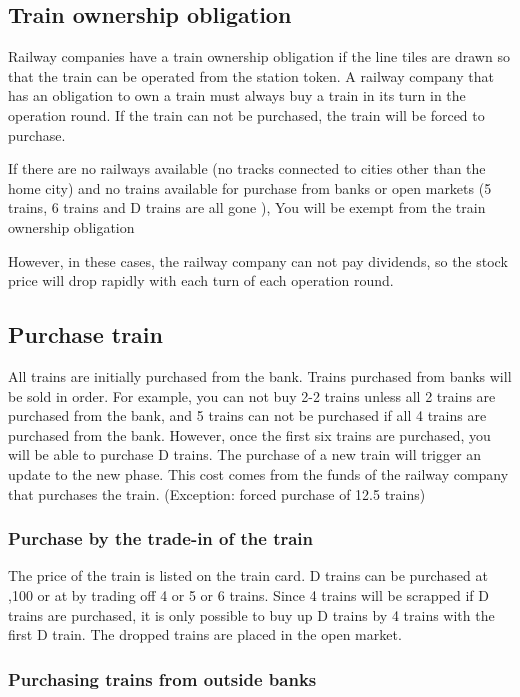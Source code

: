 \documentclass{article}
\begin{document}
\begin{CJK}{UTF8}{min}
\subsection{Train ownership obligation}

Railway companies have a train ownership obligation if the line tiles
are drawn so that the train can be operated from the station token. A
railway company that has an obligation to own a train must always buy
a train in its turn in the operation round. If the train can not be
purchased, the train will be forced to purchase.

If there are no railways available (no tracks connected to cities
other than the home city) and no trains available for purchase from
banks or open markets (5 trains, 6 trains and D trains are all gone ),
You will be exempt from the train ownership obligation

However, in these cases, the railway company can not pay dividends, so
the stock price will drop rapidly with each turn of each operation
round.

\subsection{Purchase train}

All trains are initially purchased from the bank. Trains purchased
from banks will be sold in order. For example, you can not buy 2-2
trains unless all 2 trains are purchased from the bank, and 5 trains
can not be purchased if all 4 trains are purchased from the
bank. However, once the first six trains are purchased, you will be
able to purchase D trains. The purchase of a new train will trigger an
update to the new phase. This cost comes from the funds of the railway
company that purchases the train. (Exception: forced purchase of 12.5
trains)

\subsubsection{Purchase by the trade-in of the train}

The price of the train is listed on the train card. D trains can be
purchased at ,100 or at  by trading off 4 or 5 or
6 trains. Since 4 trains will be scrapped if D trains are purchased,
it is only possible to buy up D trains by 4 trains with the first D
train. The dropped trains are placed in the open market.

\subsubsection{Purchasing trains from outside banks}


\end{CJK}
\end{document}

